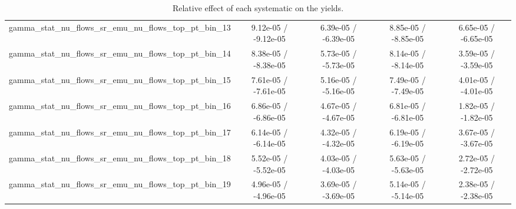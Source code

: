 \documentclass[10pt]{article}
\begin{document}
\begin{table}[htbp]
\begin{center}
\begin{tabular}{|c|c|c|c|c|}
  gamma_stat_nu_flows_sr_emu_nu_flows_top_pt_bin_13 & 9.12e-05 / -9.12e-05 & 6.39e-05 / -6.39e-05 & 8.85e-05 / -8.85e-05 & 6.65e-05 / -6.65e-05 \\ 
  gamma_stat_nu_flows_sr_emu_nu_flows_top_pt_bin_14 & 8.38e-05 / -8.38e-05 & 5.73e-05 / -5.73e-05 & 8.14e-05 / -8.14e-05 & 3.59e-05 / -3.59e-05 \\ 
  gamma_stat_nu_flows_sr_emu_nu_flows_top_pt_bin_15 & 7.61e-05 / -7.61e-05 & 5.16e-05 / -5.16e-05 & 7.49e-05 / -7.49e-05 & 4.01e-05 / -4.01e-05 \\ 
  gamma_stat_nu_flows_sr_emu_nu_flows_top_pt_bin_16 & 6.86e-05 / -6.86e-05 & 4.67e-05 / -4.67e-05 & 6.81e-05 / -6.81e-05 & 1.82e-05 / -1.82e-05 \\ 
  gamma_stat_nu_flows_sr_emu_nu_flows_top_pt_bin_17 & 6.14e-05 / -6.14e-05 & 4.32e-05 / -4.32e-05 & 6.19e-05 / -6.19e-05 & 3.67e-05 / -3.67e-05 \\ 
  gamma_stat_nu_flows_sr_emu_nu_flows_top_pt_bin_18 & 5.52e-05 / -5.52e-05 & 4.03e-05 / -4.03e-05 & 5.63e-05 / -5.63e-05 & 2.72e-05 / -2.72e-05 \\ 
  gamma_stat_nu_flows_sr_emu_nu_flows_top_pt_bin_19 & 4.96e-05 / -4.96e-05 & 3.69e-05 / -3.69e-05 & 5.14e-05 / -5.14e-05 & 2.38e-05 / -2.38e-05 \\ 
\hline 
\end{tabular} 
\caption{Relative effect of each systematic on the yields.} 
\end{center} 
\end{table} 
\end{document}
